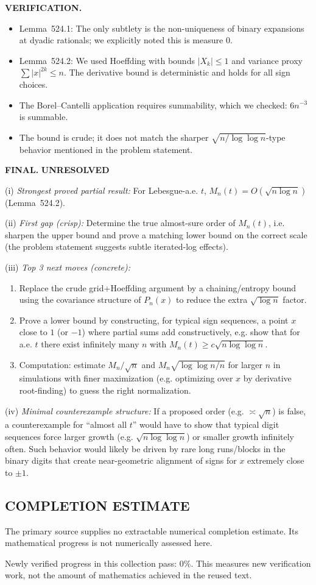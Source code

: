\bigskip
\noindent\textbf{VERIFICATION.}
\begin{itemize}
\item Lemma~524.1: The only subtlety is the non-uniqueness of binary expansions at dyadic rationals; we explicitly noted this is measure $0$.
\item Lemma~524.2: We used Hoeffding with bounds $|X_k|\le 1$ and variance proxy $\sum |x|^{2k}\le n$. The derivative bound is deterministic and holds for all sign choices.
\item The Borel--Cantelli application requires summability, which we checked: $6n^{-3}$ is summable.
\item The bound is crude; it does not match the sharper $\sqrt{n/\log\log n}$-type behavior mentioned in the problem statement.
\end{itemize}

\bigskip
\noindent\textbf{FINAL.} \textbf{UNRESOLVED}

(i) \emph{Strongest proved partial result:}
For Lebesgue-a.e. $t$, $M_n(t)=O(\sqrt{n\log n})$ (Lemma~524.2).

(ii) \emph{First gap (crisp):}
Determine the true almost-sure order of $M_n(t)$, i.e. sharpen the upper bound and prove a matching lower bound on the correct scale (the problem statement suggests subtle iterated-log effects).

(iii) \emph{Top 3 next moves (concrete):}
\begin{enumerate}
\item Replace the crude grid+Hoeffding argument by a chaining/entropy bound using the covariance structure of $P_n(x)$ to reduce the extra $\sqrt{\log n}$ factor.
\item Prove a lower bound by constructing, for typical sign sequences, a point $x$ close to $1$ (or $-1$) where partial sums add constructively, e.g. show that for a.e. $t$ there exist infinitely many $n$ with $M_n(t)\ge c\sqrt{n\log\log n}$.
\item Computation: estimate $M_n/\sqrt{n}$ and $M_n\sqrt{\log\log n/n}$ for larger $n$ in simulations with finer maximization (e.g. optimizing over $x$ by derivative root-finding) to guess the right normalization.
\end{enumerate}

(iv) \emph{Minimal counterexample structure:}
If a proposed order (e.g. $\asymp \sqrt{n}$) is false, a counterexample for ``almost all $t$'' would have to show that typical digit sequences force larger growth (e.g. $\sqrt{n\log\log n}$) or smaller growth infinitely often. Such behavior would likely be driven by rare long runs/blocks in the binary digits that create near-geometric alignment of signs for $x$ extremely close to $\pm 1$.




\subsection*{COMPLETION ESTIMATE}
The primary source supplies no extractable numerical completion estimate. Its mathematical progress is not numerically assessed here.

Newly verified progress in this collection pass: $0\%$. This measures new verification work, not the amount of mathematics achieved in the reused text.
